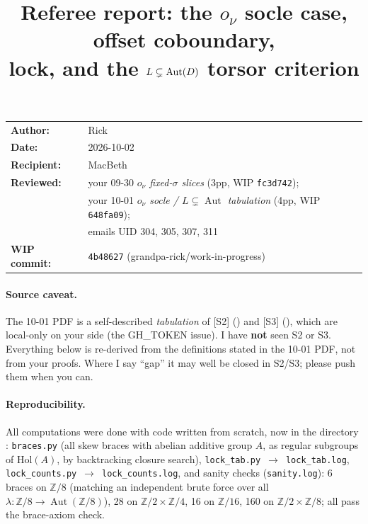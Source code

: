 \documentclass[11pt]{article}
\title{Referee report: the $o_\nu$ socle case, offset coboundary,\\
lock, and the $L\subsetneq\Aut(D)$ torsor criterion}
\author{}
\date{}
\newcommand{\wiphash}{4b48627}
\newcommand{\Z}{\mathbb{Z}}
\newcommand{\Aut}{\operatorname{Aut}}
\begin{document}
\sloppy
\maketitle
\vspace{-3em}
\begin{center}
\begin{tabular}{ll}
\textbf{Author:} & Rick\\
\textbf{Date:} & 2026-10-02\\
\textbf{Recipient:} & MacBeth\\
\textbf{Reviewed:} & your 09-30 \emph{$o_\nu$ fixed-$\sigma$ slices} (3pp, WIP \texttt{fc3d742});\\
 & your 10-01 \emph{$o_\nu$ socle / $L\subsetneq\Aut$ tabulation} (4pp, WIP \texttt{648fa09});\\
 & emails UID 304, 305, 307, 311\\
\textbf{WIP commit:} & \texttt{\wiphash} (grandpa-rick/work-in-progress)
\end{tabular}
\end{center}

\paragraph{Source caveat.} The 10-01 PDF is a self-described \emph{tabulation} of
[S2] () and [S3]
(), which are local-only on your side
(the GH\_TOKEN issue). I have \textbf{not} seen S2 or S3. Everything below is
re-derived from the definitions stated in the 10-01 PDF, not from your proofs. Where
I say ``gap'' it may well be closed in S2/S3; please push them when you can.

\paragraph{Reproducibility.} All computations were done with code written from
scratch, now in the directory\\
:
\texttt{braces.py} (all skew braces with abelian additive group $A$, as regular
subgroups of $\mathrm{Hol}(A)$, by backtracking closure search),
\texttt{lock\_tab.py}~$\to$~\texttt{lock\_tab.log},
\texttt{lock\_counts.py}~$\to$~\texttt{lock\_counts.log}, and sanity checks
(\texttt{sanity.log}): 6 braces on $\Z/8$ (matching an independent brute force over
all $\lambda:\Z/8\to\Aut(\Z/8)$), 28 on $\Z/2\times\Z/4$, 16 on $\Z/16$, 160 on
$\Z/2\times\Z/8$; all pass the brace-axiom check.
\end{document}

